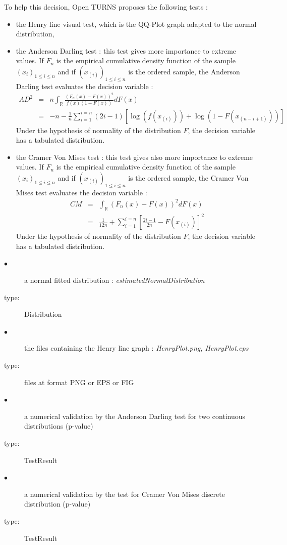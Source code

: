 To help this decision,  Open TURNS proposes the following tests :
\begin{itemize}
\item the Henry line visual test, which is the QQ-Plot graph adapted to the normal distribution,
\item the Anderson Darling test : this test gives more importance to extreme values. If $F_n$ is the empirical cumulative density function of the sample $(x_i)_{1 \leq i \leq n}$ and if $(x_{(i)})_{1 \leq i \leq n}$ is the ordered sample, the Anderson Darling test evaluates the decision variable :
  $$
  \begin{array}{lcl}
    AD^2 & = & \displaystyle  n \int_{\mathbb{R}} \frac{(F_n(x) - F(x))^2}{f(x)(1-F(x))} dF(x)\\
    & = &  \displaystyle -n -\frac{1}{n} \sum_{i=1}^{i=n} (2i-1)[\log(f(x_{(i)})) + \log(1-F(x_{(n-i+1)}))]
  \end{array}
  $$
  Under the hypothesis of normality of the distribution $F$, the decision variable has a tabulated distribution.
\item the Cramer Von Mises test : this test gives also more importance to extreme values. If $F_n$ is the empirical cumulative density function of the sample $(x_i)_{1 \leq i \leq n}$ and if $(x_{(i)})_{1 \leq i \leq n}$ is the ordered sample, the Cramer Von Mises test evaluates the decision variable :
  $$
  \begin{array}{lcl}
    CM & = & \displaystyle  \int_{\mathbb{R}}(F_n(x) - F(x))^2dF(x)\\
    & = &  \displaystyle \frac{1}{12n} + \sum_{i=1}^{i=n} \left[\frac{2i-1}{2n} - F(x_{(i)}) \right]^2
  \end{array}
  $$
  Under the hypothesis of normality of the distribution $F$, the decision variable has a tabulated distribution.
\end{itemize}

{
  \begin{description}
  \item[$\bullet$] a normal fitted distribution : {\itshape estimatedNormalDistribution}
  \item[type:]  Distribution
  \item[$\bullet$] the files containing the Henry line graph : {\itshape HenryPlot.png, HenryPlot.eps}
  \item[type:] files at format PNG or EPS or FIG
  \item[$\bullet$] a numerical validation by the Anderson Darling test for two continuous distributions (p-value)
  \item[type:] TestResult
  \item[$\bullet$] a numerical validation by the  test for Cramer Von Mises discrete distribution (p-value)
  \item[type:] TestResult
  \end{description}
}

